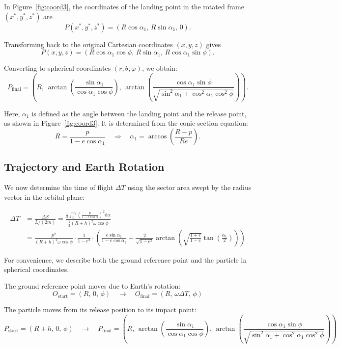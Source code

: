 \documentclass[11pt,en]{elegantpaper}
\begin{document}
In Figure~\ref{fig:coord3}, the coordinates of the landing point in the rotated frame $(x^*, y^*, z^*)$ are
\[
P(x^*, y^*, z^*) = (R \cos \alpha_1,\, R \sin \alpha_1,\, 0).
\]

Transforming back to the original Cartesian coordinates $(x, y, z)$ gives
\[
P(x, y, z) = (R \cos \alpha_1 \cos \phi,\, R \sin \alpha_1,\, R \cos \alpha_1 \sin \phi).
\]

Converting to spherical coordinates $(r, \theta, \varphi)$, we obtain:
\[
P_{\text{final}} = \left(
R,\,
\arctan\left( \frac{\sin \alpha_1}{\cos \alpha_1 \cos \phi} \right),\,
\arctan\left( \frac{\cos \alpha_1 \sin \phi}{\sqrt{\sin^2 \alpha_1 + \cos^2 \alpha_1 \cos^2 \phi}} \right)
\right).
\]

Here, $\alpha_1$ is defined as the angle between the landing point and the release point, as shown in Figure~\ref{fig:coord3}. It is determined from the conic section equation:
\[
R = \frac{p}{1 - e \cos \alpha_1} \quad \Rightarrow \quad \alpha_1 = \arccos\left( \frac{R - p}{R e} \right).
\]


\subsection{Trajectory and Earth Rotation}

We now determine the time of flight $\Delta T$ using the sector area swept by the radius vector in the orbital plane:

\begin{align}
    \Delta T 
    &= \frac{\Delta S}{L/(2m)} 
    = \frac{\frac{1}{2} \int_{0}^{\alpha_1} \left( \frac{p}{1 - e \cos\alpha} \right)^2 \mathrm{d}\alpha}
            {\frac{1}{2}(R + h)^2 \omega \cos\phi} \\
    &= \frac{p^2}{(R + h)^2 \omega \cos\phi} \cdot \frac{1}{1 - e^2} \cdot 
       \left(
           \frac{e \sin\alpha_1}{1 - e \cos\alpha_1} +
           \frac{2}{\sqrt{1 - e^2}} \arctan\left(
               \sqrt{\frac{1 + e}{1 - e}} \tan\left( \frac{\alpha_1}{2} \right)
           \right)
       \right)
\end{align}

For convenience, we describe both the ground reference point and the particle in spherical coordinates.

The ground reference point moves due to Earth’s rotation:
\[
O_{\text{start}} = (R,\, 0,\, \phi) 
\quad \rightarrow \quad 
O_{\text{final}} = (R,\, \omega \Delta T,\, \phi)
\]

The particle moves from its release position to its impact point:
\[
P_{\text{start}} = (R + h,\, 0,\, \phi) 
\quad \rightarrow \quad 
P_{\text{final}} = \left(
R,\,
\arctan\left( \frac{\sin \alpha_1}{\cos \alpha_1 \cos \phi} \right),\,
\arctan\left( \frac{\cos \alpha_1 \sin \phi}
{\sqrt{\sin^2 \alpha_1 + \cos^2 \alpha_1 \cos^2 \phi}} \right)
\right)
\]
\end{document}
